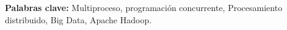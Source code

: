 \textbf{Palabras clave:} Multiproceso, programación concurrente,
  Procesamiento distribuido, Big Data, Apache Hadoop.
